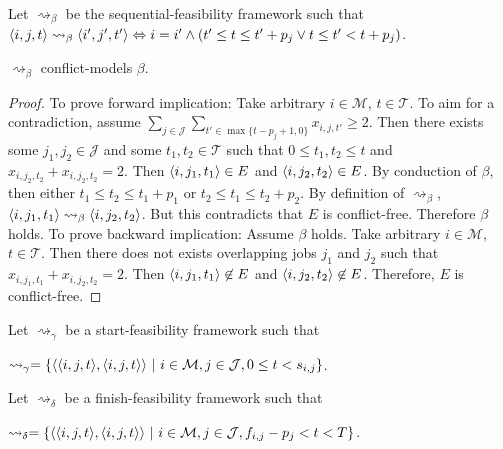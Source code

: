 \begin{definition}
	\label{intervalbeta}
	
	Let $\rightsquigarrow_\beta$ be the sequential-feasibility framework such that $\langle{i},{j},{t}\rangle\rightsquigarrow_\beta\langle{i'},{j'},{t'}\rangle\Leftrightarrow i=i'\land(t'\leq t\leq t'+p_j\lor t\leq t'<t+p_j)$.
\end{definition}

\begin{lemma}
	\label{conflictfreenessbeta}
	$\rightsquigarrow_\beta$ conflict-models $\beta$.
	
	\begin{proof}
		To prove forward implication: Take arbitrary $i\in\mathcal{M}$, $t\in\mathcal{T}$. To aim for a contradiction, assume $\sum_{j\in\mathcal{J}}\sum_{t'\in\max\{t-p_j+1,0\}}x_{i,j,t'}\geq 2$. Then there exists some $j_1,j_2\in\mathcal{J}$ and some $t_1,t_2\in\mathcal{T}$ such that $0\leq t_1,t_2\leq t$ and $x_{i,j_2,t_2}+x_{i,j_2,t_2}=2$. Then $\langle{i},{j_1},{t_1}\rangle\in E$ and $\langle{i},{j_2},{t_2}\rangle\in E$. By conduction of $\beta$, then either $t_1\leq t_2\leq t_1+p_1$ or $t_2\leq t_1\leq t_2+p_2$. By definition of $\rightsquigarrow_\beta$, $\langle{i},{j_1},{t_1}\rangle\rightsquigarrow_\beta\langle{i},{j_2},{t_2}\rangle$. But this contradicts that $E$ is conflict-free. Therefore $\beta$ holds.
		\linespace
		To prove backward implication: Assume $\beta$ holds. Take arbitrary $i\in\mathcal{M}$, $t\in\mathcal{T}$. Then there does not exists overlapping jobs $j_1$ and $j_2$ such that $x_{i,j_1,t_1}+x_{i,j_2,t_2}=2$. Then $\langle{i},{j_1},{t_1}\rangle\not\in E$ and $\langle{i},{j_2},{t_2}\rangle\not\in E$. Therefore, $E$ is conflict-free.
	\end{proof}
\end{lemma}

\begin{definition}
	\label{intervalgamma}
	
	Let $\rightsquigarrow_\gamma$ be a start-feasibility framework such that
	
	$\rightsquigarrow_\gamma=\{\pair{\triple{i}{j}{t}}{\triple{i}{j}{t}}\ |\ i\in\mathcal{M},j\in\mathcal{J},0\leq t<s_{i,j}\}$.
\end{definition}

\begin{definition}
	\label{intervaldelta}
	Let $\rightsquigarrow_\delta$ be a finish-feasibility framework such that
	
	$\rightsquigarrow_\delta=\{\pair{\triple{i}{j}{t}}{\triple{i}{j}{t}}\ |\ i\in\mathcal{M},j\in\mathcal{J},f_{i,j}-p_j<t<T\}$.
\end{definition}

